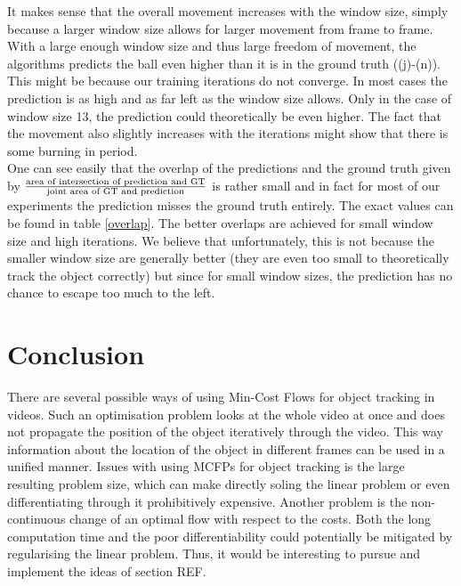 \documentclass{article}
\begin{document}
It makes sense that the overall movement increases with the window size, simply because a larger window size allows for larger movement from frame to frame. With a large enough window size and thus large freedom of movement, the algorithms predicts the ball even higher than it is in the ground truth ((j)-(n)). This might be because our training iterations do not converge. In most cases the prediction is as high and as far left as the window size allows. Only in the case of window size 13, the prediction could theoretically be even higher. The fact that the movement also slightly increases with the iterations might show that there is some burning in period.\\
One can see easily that the overlap of the predictions and the ground truth given by $\frac{\textnormal{area of intersection of prediction and GT}}{\textnormal{joint area of GT and prediction}}$ is rather small and in fact for most of our experiments the prediction misses the ground truth entirely. The exact values can be found in table \ref{overlap}. The better overlaps are achieved for small window size and high iterations. We believe that unfortunately, this is not because the smaller window size are generally better (they are even too small to theoretically track the object correctly) but since for small window sizes, the prediction has no chance to escape too much to the left.

\section{Conclusion}
There are several possible ways of using Min-Cost Flows for object tracking in videos. Such an optimisation problem looks at the whole video at once and does not propagate the position of the object iteratively through the video. This way information about the location of the object in different frames can be used in a unified manner. Issues with using MCFPs for object tracking is the large resulting problem size, which can make directly soling the linear problem or even differentiating through it prohibitively expensive. Another problem is the non-continuous change of an optimal flow with respect to the costs. Both the long computation time and the poor differentiability could potentially be mitigated by regularising the linear problem. Thus, it would be interesting to pursue and implement the ideas of section REF.


\end{document}
